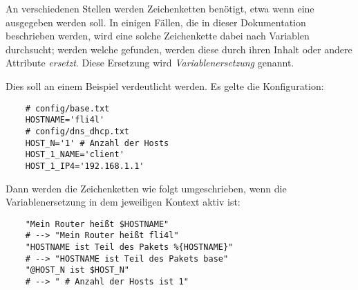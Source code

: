     An verschiedenen Stellen werden Zeichenketten benötigt, etwa wenn eine
     ausgegeben werden soll. In einigen Fällen,
    die in dieser Dokumentation beschrieben werden, wird eine solche
    Zeichenkette dabei nach Variablen durchsucht; werden welche gefunden,
    werden diese durch ihren Inhalt oder andere Attribute \emph{ersetzt}.
    Diese Ersetzung wird \emph{Variablenersetzung} genannt.

    Dies soll an einem Beispiel verdeutlicht werden. Es gelte die Konfiguration:

\begin{example}
\begin{verbatim}
    # config/base.txt
    HOSTNAME='fli4l'
    # config/dns_dhcp.txt
    HOST_N='1' # Anzahl der Hosts
    HOST_1_NAME='client'
    HOST_1_IP4='192.168.1.1'
\end{verbatim}
\end{example}

    Dann werden die Zeichenketten wie folgt umgeschrieben, wenn die
    Variablenersetzung in dem jeweiligen Kontext aktiv ist:

\begin{example}
\begin{verbatim}
    "Mein Router heißt $HOSTNAME"
    # --> "Mein Router heißt fli4l"
    "HOSTNAME ist Teil des Pakets %{HOSTNAME}"
    # --> "HOSTNAME ist Teil des Pakets base"
    "@HOST_N ist $HOST_N"
    # --> " # Anzahl der Hosts ist 1"
\end{verbatim}
\end{example}

